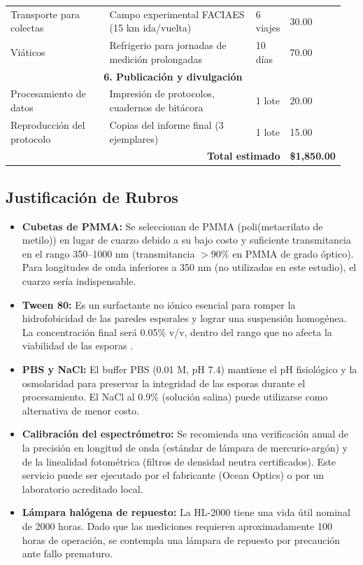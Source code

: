 \documentclass[12pt, a4paper]{article}
\begin{document}
\begin{table}
\begin{tabular}{p{0.3\linewidth}p{0.45\linewidth}p{0.1\linewidth}p{0.1\linewidth}}
			\midrule
			Transporte para colectas & Campo experimental FACIAES (15 km ida/vuelta) & 6 viajes & 30.00 \\
			Viáticos & Refrigerio para jornadas de medición prolongadas & 10 días & 70.00 \\
			\midrule
			\multicolumn{4}{c}{\textbf{6. Publicación y divulgación}} \\
			\midrule
			Procesamiento de datos & Impresión de protocolos, cuadernos de bitácora & 1 lote & 20.00 \\
			Reproducción del protocolo & Copias del informe final (3 ejemplares) & 1 lote & 15.00 \\
			\midrule
			\multicolumn{3}{r}{\textbf{Total estimado}} & \textbf{\$1,850.00} \\
			\bottomrule
		\end{tabular}
	\end{table}
	
	\subsection{Justificación de Rubros}
	
	\begin{itemize}
		\item \textbf{Cubetas de PMMA:} Se seleccionan de PMMA (poli(metacrilato de metilo)) en lugar de cuarzo debido a su bajo costo y suficiente transmitancia en el rango 350--1000 nm (transmitancia $> 90\%$ en PMMA de grado óptico). Para longitudes de onda inferiores a 350 nm (no utilizadas en este estudio), el cuarzo sería indispensable.
		
		\item \textbf{Tween 80:} Es un surfactante no iónico esencial para romper la hidrofobicidad de las paredes esporales y lograr una suspensión homogénea. La concentración final será 0.05\% v/v, dentro del rango que no afecta la viabilidad de las esporas \parencite{Silva2006}.
		
		\item \textbf{PBS y NaCl:} El buffer PBS (0.01 M, pH 7.4) mantiene el pH fisiológico y la osmolaridad para preservar la integridad de las esporas durante el procesamiento. El NaCl al 0.9\% (solución salina) puede utilizarse como alternativa de menor costo.
		
		\item \textbf{Calibración del espectrómetro:} Se recomienda una verificación anual de la precisión en longitud de onda (estándar de lámpara de mercurio-argón) y de la linealidad fotométrica (filtros de densidad neutra certificados). Este servicio puede ser ejecutado por el fabricante (Ocean Optics) o por un laboratorio acreditado local.
		
		\item \textbf{Lámpara halógena de repuesto:} La HL-2000 tiene una vida útil nominal de 2000 horas. Dado que las mediciones requieren aproximadamente 100 horas de operación, se contempla una lámpara de repuesto por precaución ante fallo prematuro.
	\end{itemize}
\newpage	
\end{document}
